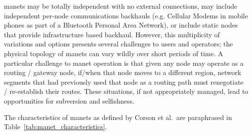 \glspl{manet} may be totally independent with no external connections, may include independent per-node communications backhauls (e.g. Cellular Modems in mobile phones as part of a Bluetooth Personal Area Network), or include static nodes that provide infrastructure based backhaul.
However, this multiplicity of variations and options presents several challenges to users and operators; the physical topology of \glspl{manet} can vary wildly over short periods of time.
A particular challenge to \gls{manet} operation is that given any node may operate as a routing / gateway node, if/when that node moves to a different region, network segments that had previously used that node as a routing path must renegotiate / re-establish their routes.
These situations, if not appropriately managed, lead to opportunities for subversion and selfishness.

The characteristics of \gls{manet}s as defined by Corson et al.\ are paraphrased in Table~\ref{tab:manet_characteristics}.

